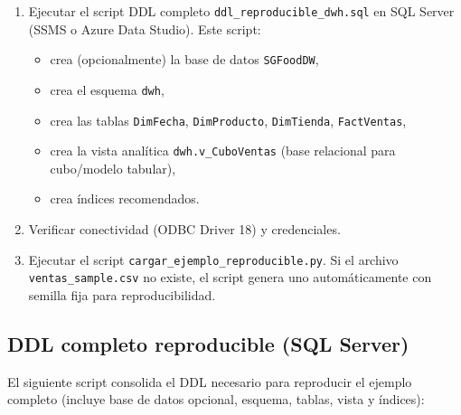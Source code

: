 \documentclass[12pt]{article}
\begin{document}
\begin{enumerate}[leftmargin=*]
\item Ejecutar el script DDL completo \texttt{ddl\_reproducible\_dwh.sql} en SQL Server (SSMS o Azure Data Studio). Este script:
  \begin{itemize}
    \item crea (opcionalmente) la base de datos \texttt{SGFoodDW},
    \item crea el esquema \texttt{dwh},
    \item crea las tablas \texttt{DimFecha}, \texttt{DimProducto}, \texttt{DimTienda}, \texttt{FactVentas},
    \item crea la vista analítica \texttt{dwh.v\_CuboVentas} (base relacional para cubo/modelo tabular),
    \item crea índices recomendados.
  \end{itemize}
\item Verificar conectividad (ODBC Driver 18) y credenciales.
\item Ejecutar el script \texttt{cargar\_ejemplo\_reproducible.py}. Si el archivo \texttt{ventas\_sample.csv} no existe, el script genera uno automáticamente con semilla fija para reproducibilidad.
\end{enumerate}

\subsection{DDL completo reproducible (SQL Server)}
El siguiente script consolida el DDL necesario para reproducir el ejemplo completo (incluye base de datos opcional, esquema, tablas, vista y índices):
\end{document}
